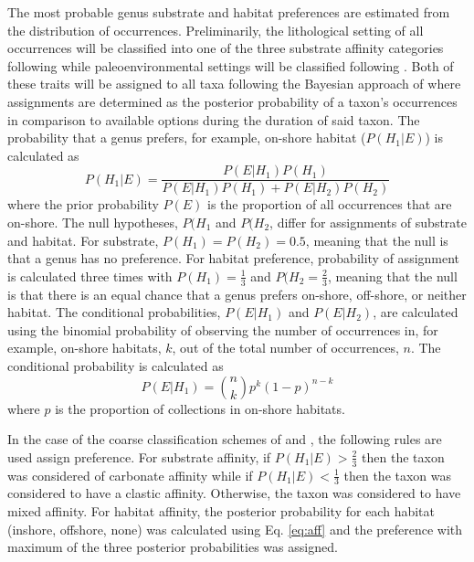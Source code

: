 \documentclass[12pt,letterpaper]{article}
\begin{document}
The most probable genus substrate and habitat preferences are estimated from the distribution of occurrences. Preliminarily, the lithological setting of all occurrences will be classified into one of the three substrate affinity categories following \citet{Foote2006} while paleoenvironmental settings will be classified following \citet{Kiessling2007}. Both of these traits will be assigned to all taxa following the Bayesian approach of \citet{Simpson2009} where assignments are determined as the posterior probability of a taxon's occurrences in comparison to available options during the duration of said taxon. The probability that a genus prefers, for example, on-shore habitat (\(P(H_{1}|E)\)) is calculated as
\begin{equation}
  P(H_{1}|E) = \frac{P(E|H_{1})P(H_{1})}{P(E|H_{1})P(H_{1}) + P(E|H_{2})P(H_{2})}
  \label{eq:aff}
\end{equation}
where the prior probability \(P(E)\) is the proportion of all occurrences that are on-shore. The null hypotheses, \(P(H_{1}\) and \(P(H_{2}\), differ for assignments of substrate and habitat. For substrate, \(P(H_{1}) = P(H_{2}) = 0.5\), meaning that the null is that a genus has no preference. For habitat preference, probability of assignment is calculated three times with \(P(H_{1}) = \frac{1}{3}\) and \(P(H_{2} = \frac{2}{3}\), meaning that the null is that there is an equal chance that a genus prefers on-shore, off-shore, or neither habitat. The conditional probabilities, \(P(E|H_{1})\) and \(P(E|H_{2})\), are calculated using the binomial probability of observing the number of occurrences in, for example, on-shore habitats, \(k\), out of the total number of occurrences, \(n\). The conditional probability is calculated as
\begin{equation}
  P(E|H_{1}) = \binom{n}{k} p^{k}(1 - p)^{n - k}
  \label{eq:condprob}
\end{equation}
where \(p\) is the proportion of collections in on-shore habitats.

In the case of the coarse classification schemes of \citet{Foote2006} and \citet{Kiessling2007}, the following rules are used assign preference. For substrate affinity, if \(P(H_{1}|E) > \frac{2}{3}\) then the taxon was considered of carbonate affinity while if \(P(H_{1}|E) < \frac{1}{3}\) then the taxon was considered to have a clastic affinity. Otherwise, the taxon was considered to have mixed affinity. For habitat affinity, the posterior probability for each habitat (inshore, offshore, none) was calculated using Eq. \ref{eq:aff} and the preference with maximum of the three posterior probabilities was assigned.
\end{document}
